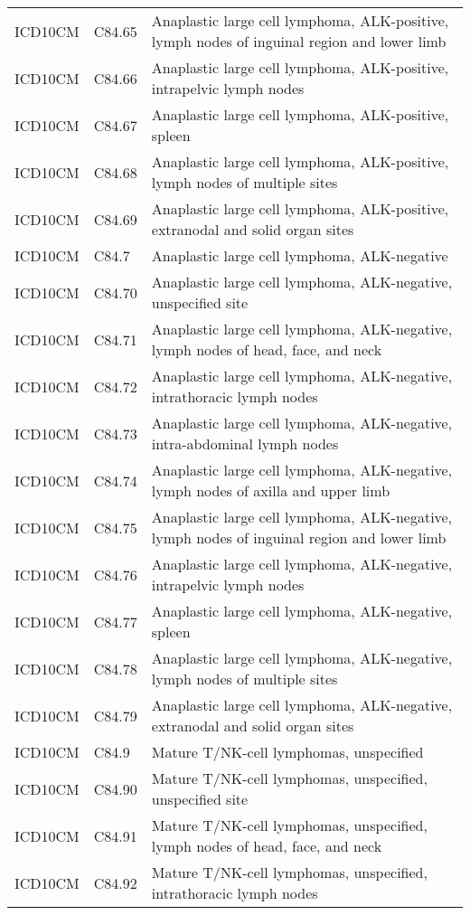 \begin{longtable}{p{}p{}p{}}
  ICD10CM & C84.65 & Anaplastic large cell lymphoma, ALK-positive, lymph nodes of inguinal region and lower limb \\ 
  ICD10CM & C84.66 & Anaplastic large cell lymphoma, ALK-positive, intrapelvic lymph nodes \\ 
  ICD10CM & C84.67 & Anaplastic large cell lymphoma, ALK-positive, spleen \\ 
  ICD10CM & C84.68 & Anaplastic large cell lymphoma, ALK-positive, lymph nodes of multiple sites \\ 
  ICD10CM & C84.69 & Anaplastic large cell lymphoma, ALK-positive, extranodal and solid organ sites \\ 
  ICD10CM & C84.7 & Anaplastic large cell lymphoma, ALK-negative \\ 
  ICD10CM & C84.70 & Anaplastic large cell lymphoma, ALK-negative, unspecified site \\ 
  ICD10CM & C84.71 & Anaplastic large cell lymphoma, ALK-negative, lymph nodes of head, face, and neck \\ 
  ICD10CM & C84.72 & Anaplastic large cell lymphoma, ALK-negative, intrathoracic lymph nodes \\ 
  ICD10CM & C84.73 & Anaplastic large cell lymphoma, ALK-negative, intra-abdominal lymph nodes \\ 
  ICD10CM & C84.74 & Anaplastic large cell lymphoma, ALK-negative, lymph nodes of axilla and upper limb \\ 
  ICD10CM & C84.75 & Anaplastic large cell lymphoma, ALK-negative, lymph nodes of inguinal region and lower limb \\ 
  ICD10CM & C84.76 & Anaplastic large cell lymphoma, ALK-negative, intrapelvic lymph nodes \\ 
  ICD10CM & C84.77 & Anaplastic large cell lymphoma, ALK-negative, spleen \\ 
  ICD10CM & C84.78 & Anaplastic large cell lymphoma, ALK-negative, lymph nodes of multiple sites \\ 
  ICD10CM & C84.79 & Anaplastic large cell lymphoma, ALK-negative, extranodal and solid organ sites \\ 
  ICD10CM & C84.9 & Mature T/NK-cell lymphomas, unspecified \\ 
  ICD10CM & C84.90 & Mature T/NK-cell lymphomas, unspecified, unspecified site \\ 
  ICD10CM & C84.91 & Mature T/NK-cell lymphomas, unspecified, lymph nodes of head, face, and neck \\ 
  ICD10CM & C84.92 & Mature T/NK-cell lymphomas, unspecified, intrathoracic lymph nodes \\ 

\end{longtable}
